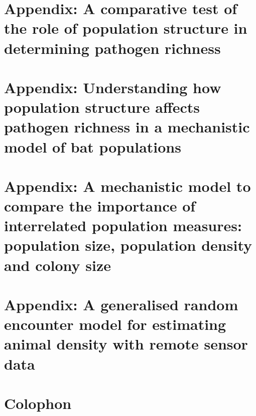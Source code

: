 



\appendix

\chapter{Appendix: A comparative test of the role of population structure in determining pathogen richness}
\label{empirAppendix}




\chapter{Appendix: Understanding how population structure affects pathogen richness in a mechanistic model of bat populations}
\label{sims1Appendix}



\chapter{Appendix: A mechanistic model to compare the importance of interrelated population measures: population size, population density and colony size}
\label{sims2Appendix}



\chapter{Appendix: A generalised random encounter model for estimating animal density with remote sensor data}
\label{gremAppendix}






\chapter{Colophon}
\label{appendixlabel3}


